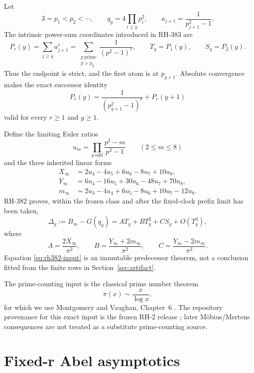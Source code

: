 \documentclass[11pt]{article}
\theoremstyle{definition}
\theoremstyle{remark}
\newcommand{\DeltaY}{\Delta_y}
\begin{document}
Let
\[
 3=p_1<p_2<\cdots,\qquad
 q_y=4\prod_{i\le y}p_i^2,\qquad
 a_{j+1}=\frac{1}{p_{j+1}^2-1}.
\]
The intrinsic power-sum coordinates introduced in RH-383 are
\begin{equation}
 P_r(y)=\sum_{j\ge y}a_{j+1}^r
       =\sum_{\substack{p\ \mathrm{prime}\\p>p_y}}
        \frac{1}{(p^2-1)^r},
 \qquad T_y=P_1(y),\qquad S_y=P_2(y).
 \label{eq:tails}
\end{equation}
Thus the endpoint is strict, and the first atom is at $p_{y+1}$.
Absolute convergence makes the exact successor identity
\begin{equation}
 P_r(y)=\frac{1}{(p_{y+1}^2-1)^r}+P_r(y+1)
 \label{eq:successor}
\end{equation}
valid for every $r\ge1$ and $y\ge1$.

Define the limiting Euler ratios
\[
 u_m=\prod_{p\ \mathrm{odd}}\frac{p^2-m}{p^2-1}
 \qquad(2\le m\le8)
\]
and the three inherited linear forms
\begin{align}
 X_\infty&=2u_4-4u_5+6u_6-8u_7+10u_8,\\
 Y_\infty&=6u_4-16u_5+30u_6-48u_7+70u_8,\\
 m_\infty&=2u_3-4u_4+6u_5-8u_6+10u_7-12u_8.
 \label{eq:XYm}
\end{align}
RH-382 proves, within the frozen class and after the fixed-clock prefix
limit has been taken,
\begin{equation}
 \DeltaY:=B_\infty-G(q_y)
 =A T_y+B T_y^2+C S_y+O(T_y^3),
 \label{eq:rh382-input}
\end{equation}
where
\begin{equation}
 A=\frac{2X_\infty}{\pi^2},\qquad
 B=\frac{Y_\infty+2m_\infty}{\pi^2},\qquad
 C=\frac{Y_\infty-2m_\infty}{\pi^2}.
 \label{eq:ABC}
\end{equation}
Equation \eqref{eq:rh382-input} is an immutable predecessor theorem, not a
conclusion fitted from the finite rows in Section~\ref{sec:artifact}.

The prime-counting input is the classical prime number theorem
\begin{equation}
 \pi(x)\sim\frac{x}{\log x},
 \label{eq:pnt}
\end{equation}
for which we use Montgomery and Vaughan, Chapter~6
\citep{MontgomeryVaughan2007}.  The repository provenance for this exact
input is the frozen RH-2 release \citep{RH2}; later M\"obius/Mertens
consequences are not treated as a substitute prime-counting source.

\section{Fixed-r Abel asymptotics}
\end{document}
